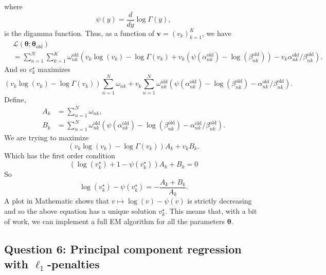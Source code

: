 where
\[\psi(y)= \frac{d}{dy}\log \Gamma(y), \]
is the digamma function. Thus, as a function of $\bm{v}=(v_k)_{k=1}^K$, we have
\begin{align*}
    &\mathcal{L}(\bm{\theta};\bm{\theta}_{\text{old}})\\
    &=\sum_{n=1}^N \sum_{k=1}^K \omega_{nk}^{\text{old}}\left(v_k\log(v_k)-\log \Gamma(v_k)+v_k\left(\psi\left(\alpha_{nk}^{\text{old}}\right) - \log\left(\beta_{nk}^{\text{old}}\right)\right) -v_k\alpha_{nk}^{\text{old}}/\beta_{nk}^{\text{old}}\right).
\end{align*}
And so $v_k^\star$ maximizes
\[ \left(v_k\log(v_k)-\log \Gamma(v_k)\right)\sum_{n=1}^N\omega_{nk} +v_k \sum_{n=1}^N \omega_{nk}^{\text{old}}\left(\psi\left(\alpha_{nk}^{\text{old}}\right) - \log\left(\beta_{nk}^{\text{old}}\right)-\alpha_{nk}^{\text{old}}/\beta_{nk}^{\text{old}}\right).  \]
Define,
\begin{align*}
    A_k &= \sum_{n=1}^N\omega_{nk},\\
    B_k &= \sum_{n=1}^N \omega_{nk}^{\text{old}}\left(\psi\left(\alpha_{nk}^{\text{old}}\right) - \log\left(\beta_{nk}^{\text{old}}\right)-\alpha_{nk}^{\text{old}}/\beta_{nk}^{\text{old}}\right).
\end{align*}
We are trying to maximize
\[(v_k\log(v_k)-\log \Gamma(v_k))A_k + v_kB_k. \]
Which has the first order condition
\[\left(\log(v_k^\star)+1 -\psi(v_k^\star)\right)A_k + B_k = 0 \]
So
\[\log(v_k^\star) - \psi(v_k^\star) = -\frac{A_k+B_k}{A_k}. \]
A plot in Mathematic shows that $v \mapsto \log(v) - \psi(v)$ is strictly decreasing and so the above equation has a unique solution $v_k^\star$. This means that, with a bit of work, we can implement a full EM algorithm for all the parameters $\bm{\theta}$. 

\subsection*{Question 6: Principal component regression with $\ell_1$-penalties}